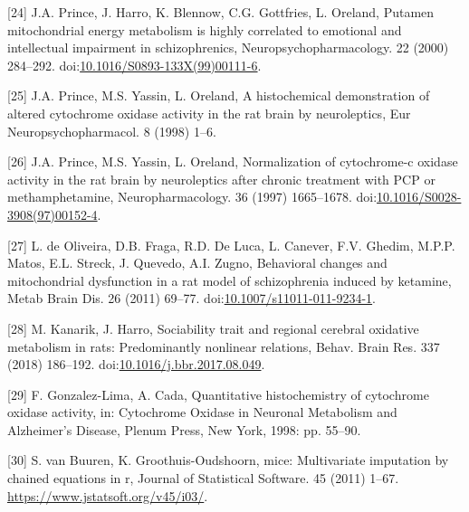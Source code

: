 \documentclass[man]{apa6}
\begin{document}
\leavevmode\hypertarget{ref-princePutamenMitochondrialEnergy2000}{}%
{[}24{]} J.A. Prince, J. Harro, K. Blennow, C.G. Gottfries, L. Oreland, Putamen mitochondrial energy metabolism is highly correlated to emotional and intellectual impairment in schizophrenics, Neuropsychopharmacology. 22 (2000) 284--292. doi:\href{https://doi.org/10.1016/S0893-133X(99)00111-6}{10.1016/S0893-133X(99)00111-6}.

\leavevmode\hypertarget{ref-princeHistochemicalDemonstrationAltered1998}{}%
{[}25{]} J.A. Prince, M.S. Yassin, L. Oreland, A histochemical demonstration of altered cytochrome oxidase activity in the rat brain by neuroleptics, Eur Neuropsychopharmacol. 8 (1998) 1--6.

\leavevmode\hypertarget{ref-princeNormalizationCytochromecOxidase1997}{}%
{[}26{]} J.A. Prince, M.S. Yassin, L. Oreland, Normalization of cytochrome-c oxidase activity in the rat brain by neuroleptics after chronic treatment with PCP or methamphetamine, Neuropharmacology. 36 (1997) 1665--1678. doi:\href{https://doi.org/10.1016/S0028-3908(97)00152-4}{10.1016/S0028-3908(97)00152-4}.

\leavevmode\hypertarget{ref-deoliveiraBehavioralChangesMitochondrial2011}{}%
{[}27{]} L. de Oliveira, D.B. Fraga, R.D. De Luca, L. Canever, F.V. Ghedim, M.P.P. Matos, E.L. Streck, J. Quevedo, A.I. Zugno, Behavioral changes and mitochondrial dysfunction in a rat model of schizophrenia induced by ketamine, Metab Brain Dis. 26 (2011) 69--77. doi:\href{https://doi.org/10.1007/s11011-011-9234-1}{10.1007/s11011-011-9234-1}.

\leavevmode\hypertarget{ref-kanarikSociabilityTraitRegional2018}{}%
{[}28{]} M. Kanarik, J. Harro, Sociability trait and regional cerebral oxidative metabolism in rats: Predominantly nonlinear relations, Behav. Brain Res. 337 (2018) 186--192. doi:\href{https://doi.org/10.1016/j.bbr.2017.08.049}{10.1016/j.bbr.2017.08.049}.

\leavevmode\hypertarget{ref-gonzalez-limaQuantitativeHistochemistryCytochrome1998}{}%
{[}29{]} F. Gonzalez-Lima, A. Cada, Quantitative histochemistry of cytochrome oxidase activity, in: Cytochrome Oxidase in Neuronal Metabolism and Alzheimer's Disease, Plenum Press, New York, 1998: pp. 55--90.

\leavevmode\hypertarget{ref-R-mice}{}%
{[}30{]} S. van Buuren, K. Groothuis-Oudshoorn, mice: Multivariate imputation by chained equations in r, Journal of Statistical Software. 45 (2011) 1--67. \url{https://www.jstatsoft.org/v45/i03/}.
\end{document}
